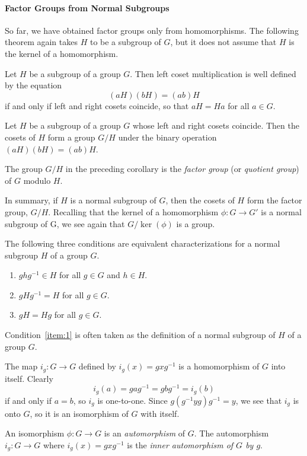 \paragraph{Factor Groups from Normal Subgroups}
So far, we have obtained factor groups only from homomorphisms.  The
following theorem again takes $H$ to be a subgroup of $G$, but it 
does not assume that $H$ is the kernel of a homomorphism.
\begin{theorem}
Let $H$ be a subgroup of a group $G$.  Then left coset multiplication
is well defined by the equation
\[
(aH)(bH)=(ab)H
\]
if and only if left and right cosets coincide, so that $aH = Ha$ for
all $a\in G$.
\end{theorem}
\begin{corollary}
Let $H$ be a subgroup of a group $G$ whose left and right cosets
coincide.  Then the cosets of $H$ form a group $G/H$ under the binary
operation $(aH)(bH) = (ab)H$.
\end{corollary}
\begin{definition}
The group $G/H$ in the preceding corollary is the \emph{factor group}
(or \emph{quotient group}) of $G$ modulo $H$.
\end{definition}
In summary, if $H$ is a normal subgroup of $G$, then the cosets of $H$
form the factor group, $G/H$.  Recalling that the kernel of a
homomorphism $\phi:G\to G'$ is a normal subgroup of G, we see
again that $G/\ker(\phi)$ is a group.

The following three conditions are equivalent characterizations for a
normal subgroup $H$ of a group $G$.
\begin{enumerate}
\item $ghg^{-1}\in H$ for all $g\in G$ and $h\in H$.
\item\label{item:1} $gHg^{-1}= H$ for all $g\in G$.
\item $gH= Hg$ for all $g\in G$.
\end{enumerate}
Condition~\ref{item:1} is often taken as the definition of a normal
subgroup of $H$ of a group $G$.

The map $i_g:G\to G$ defined by $i_g(x) = gxg^{-1}$ is a
homomorphism of $G$ into itself.  Clearly 
\[
i_g(a)= gag^{-1} = gbg^{-1} = i_g(b)
\]
if and only if $a=b$, so $i_g$ is one-to-one.  Since
$g(g^{-1}yg)g^{-1} = y$, we see that $i_g$ is onto $G$, so it is an
isomorphism of $G$ with itself.
\begin{definition}[Automorphism]
An isomorphism $\phi: G\to G$ is an \emph{automorphism} of
$G$. The automorphism $i_g:G\to G$ where $i_g(x) = gxg^{-1}$
is the \emph{inner automorphism of $G$ by $g$}.
\end{definition}

